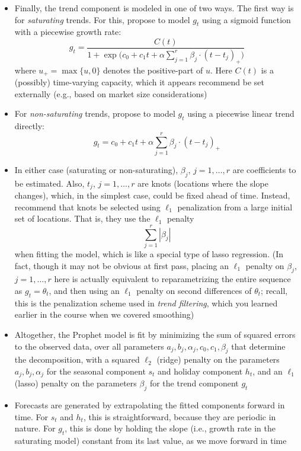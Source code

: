 \documentclass{article}
\begin{document}
\begin{itemize}
\item Finally, the trend component is modeled in one of two ways. The first way
  is for \emph{saturating} trends. For this, \citet{taylor2018forecasting}
  propose to model $g_t$ using a sigmoid function with a piecewise growth rate:  
  \[
  g_t = \frac{C(t)}{1 + \exp\Big( c_0 + c_1 t + \alpha \sum_{j=1}^r \beta_j
    \cdot (t-t_j)_+\Big)} 
  \]
  where $u_+ = \max\{u,0\}$ denotes the positive-part of $u$.
  Here $C(t)$ is a (possibly) time-varying capacity, which it appears 
  \citet{taylor2018forecasting} recommend be set externally (e.g., based on  
  market size considerations)

\item For \emph{non-saturating} trends, \citet{taylor2018forecasting}
  propose to model $g_t$ using a piecewise linear trend directly: 
  \[
  g_t = c_0 + c_1 t + \alpha \sum_{j=1}^r \beta_j \cdot (t-t_j)_+ 
  \]

\item In either case (saturating or non-saturating), $\beta_j$, $j = 1,\dots,r$
  are coefficients to be estimated. Also, $t_j$, $j = 1,\dots,r$ are knots
  (locations where the slope changes), which, in the simplest case, could be
  fixed ahead of time. Instead, \citet{taylor2018forecasting} recommend that
  knots be selected using $\ell_1$ penalization from a large initial set of 
  locations. That is, they use the $\ell_1$ penalty 
  \[
  \sum_{j=1}^r |\beta_j|
  \]
  when fitting the model, which is like a special type of lasso regression. (In
  fact, though it may not be obvious at first pass, placing an $\ell_1$ penalty
  on $\beta_j$, $j = 1,\dots,r$ here is actually equivalent to reparametrizing
  the entire sequence as $g_t = \theta_t$, and then using an $\ell_1$ penalty on  
  second differences of $\theta_t$; recall, this is the penalization scheme used
  in \emph{trend filtering}, which you learned earlier in the course when we
  covered smoothing)   

\item Altogether, the Prophet model is fit by minimizing the sum of squared
  errors to the observed data, over all parameters
  $a_j,b_j,\alpha_j,c_0,c_1,\beta_j$ that determine the decomposition, with a
  squared $\ell_2$ (ridge) penalty on the parameters $a_j,b_j,\alpha_j$ for the
  seasonal component $s_t$ and holiday component $h_t$, and an $\ell_1$ (lasso)
  penalty on the parameters $\beta_j$ for the trend component $g_t$  

\item Forecasts are generated by extrapolating the fitted components forward in 
  time. For $s_t$ and $h_t$, this is straightforward, because they are periodic
  in nature. For $g_t$, this is done by holding the slope (i.e., growth rate in
  the saturating model) constant from its last value, as we move forward in
  time 


\end{itemize}
\end{document}
